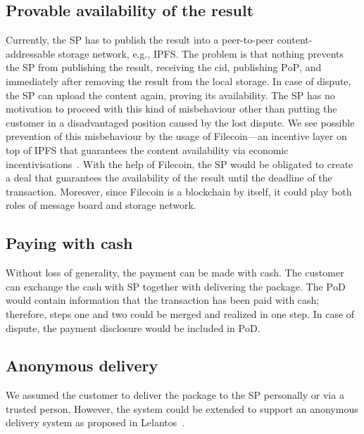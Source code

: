 \documentclass{ieeeaccess}
\begin{document}
\subsection{Provable availability of the
result}\label{cryptographically-provable-availability-of-results}

Currently, the SP has to publish the result into a peer-to-peer content-addressable storage network, e.g., IPFS. The problem is that nothing prevents the SP from publishing the result, receiving the $\mathrm{cid}$, publishing $\mathrm{PoP}$, and immediately after removing the result from the local storage. In case of dispute, the SP can upload the content again, proving its availability. The SP has no motivation to proceed with this kind of misbehaviour other than putting the customer in a disadvantaged position caused by the lost dispute. We see possible prevention of this misbehaviour by the usage of Filecoin—an incentive layer on top of IPFS that guarantees the content availability via economic incentivisations~\cite{benetfilecoin}. With the help of Filecoin, the SP would be obligated to create a deal that guarantees the availability of the result until the deadline of the transaction. Moreover, since Filecoin is a blockchain by itself, it could play both roles of message board and storage network.

\subsection{Paying with cash}\label{paying-with-cash}

Without loss of generality, the payment can be made with cash. The customer can exchange the cash with SP together with delivering the package. The $\mathrm{PoD}$ would contain information that the transaction has been paid with cash; therefore, steps one and two could be merged and realized in one step. In case of dispute, the payment disclosure would be included in $\mathrm{PoD}$.

\subsection{Anonymous delivery}\label{anonymous-delivery}

We assumed the customer to deliver the package to the SP personally or via a trusted person. However, the system could be extended to support an anonymous delivery system as proposed in Lelantos~\cite{altawy2017lelantos}.
\end{document}
